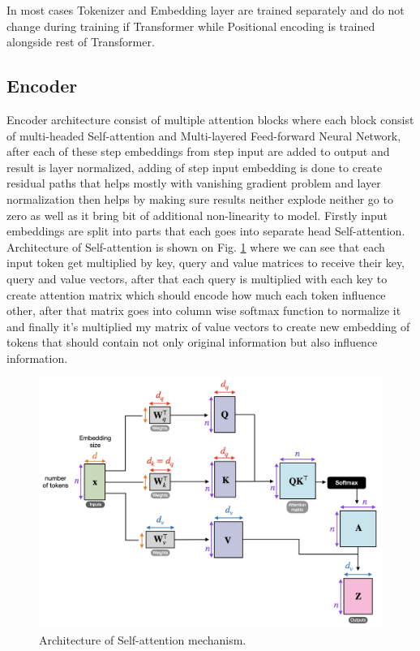 In most cases Tokenizer and Embedding layer are trained separately and do not change during training if Transformer while Positional encoding is trained alongside rest of Transformer.

\subsection{Encoder}
\label{theoryEncoder}

Encoder architecture consist of multiple attention blocks where each block consist of multi-headed Self-attention and Multi-layered Feed-forward Neural Network, after each of these step embeddings from step input are added to output and result is layer normalized, adding of step input embedding is done to create residual paths that helps mostly with vanishing gradient problem and layer normalization then helps by making sure results neither explode neither go to zero as well as it bring bit of additional non-linearity to model. Firstly input embeddings are split into parts that each goes into separate head  Self-attention.
\\

Architecture of Self-attention is shown on Fig. \ref{fig:self_att} where we can see that each input token get multiplied by key, query and value matrices to receive their key, query and value vectors, after that each query is multiplied with each key to create attention matrix which should encode how much each token influence other, after that matrix goes into column wise softmax function to normalize it and finally it's multiplied my matrix of value vectors to create new embedding of tokens that should contain not only original information but also influence information. 
\\

\begin{figure}[!h]
	\centering
	
	\includegraphics[width=1\textwidth]{images/self_attention.png}
	
	\caption{Architecture of Self-attention mechanism.}
	\label{fig:self_att}
\end{figure}

